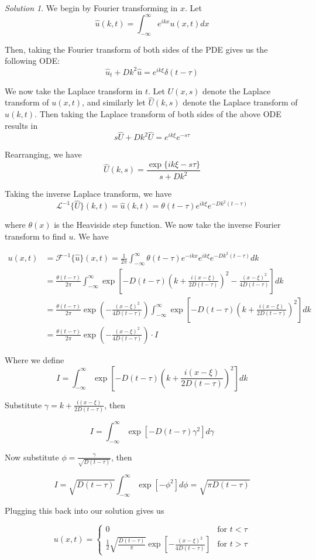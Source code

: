 \documentclass[12pt,a4paper]{article}
\theoremstyle{definition}
\theoremstyle{remark}
\newtheorem*{solution}{Solution}
\begin{document}
\begin{solution}
    We begin by Fourier transforming in $x$. Let $$\hat u(k,t) = \int_{-\infty}^\infty e^{ikx} u(x,t) dx$$

    Then, taking the Fourier transform of both sides of the PDE gives us the following ODE: $$\hat u_t + Dk^2 \hat u = e^{ik \xi} \delta(t-\tau)$$

    We now take the Laplace transform in $t$. Let $U(x, s)$ denote the Laplace transform of $u(x,t)$, and similarly let $\hat U(k,s)$ denote the Laplace transform of $\hat u(k,t)$. Then taking the Laplace transform of both sides of the above ODE results in $$s \hat U + Dk^2 \hat U = e^{ik\xi}e^{-s\tau}$$

    Rearranging, we have $$\hat U(k, s) = \frac{\exp\{ik\xi - s\tau\}}{s+Dk^2}$$

    Taking the inverse Laplace transform, we have $$\mathcal L^{-1}\{ \hat U \}(k, t) = \hat u (k,t) =  \theta(t-\tau) e^{ik\xi}e^{-Dk^2(t-\tau)}$$

    where $\theta(x)$ is the Heaviside step function. We now take the inverse Fourier transform to find $u$. We have 

    \begin{align*}
        u(x,t) &= \mathcal F^{-1}\{\hat u \}(x,t) = \frac{1}{2\pi} \int_{-\infty}^{\infty} \theta(t-\tau)e^{-ikx}e^{ik\xi}e^{-Dk^2(t-\tau)}dk \\ 
        &= \frac{\theta(t-\tau)}{2\pi} \int_{-\infty}^\infty \exp \left[ -D(t-\tau)\left(k+ \frac{i(x-\xi)}{2D(t-\tau)} \right)^2 - \frac{(x-\xi)^2}{4D(t-\tau)} \right] dk \\
        &= \frac{\theta(t-\tau)}{2\pi} \exp \left(-\frac{(x-\xi)^2}{4D(t-\tau)}\right) \int_{-\infty}^\infty \exp \left[ -D(t-\tau)\left(k+ \frac{i(x-\xi)}{2D(t-\tau)}\right)^2 \right] dk \\
        &= \frac{\theta(t-\tau)}{2\pi} \exp \left(-\frac{(x-\xi)^2}{4D(t-\tau)}\right) \cdot I
    \end{align*}

    Where we define $$I = \int_{-\infty}^\infty \exp \left[ -D(t-\tau)\left(k+ \frac{i(x-\xi)}{2D(t-\tau)}\right)^2 \right] dk$$

    Substitute $\gamma = k+ \frac{i(x-\xi)}{2D(t-\tau)}$, then 

    $$I = \int_{-\infty}^\infty \exp \left[ -D(t-\tau) \gamma^2 \right] d\gamma$$

    Now substitute $\phi = \frac{\gamma}{\sqrt{D(t-\tau)}}$, then 

    $$I = \sqrt{D(t-\tau)} \int_{-\infty}^\infty \exp\left[ - \phi^2 \right] d\phi = \sqrt{\pi D(t-\tau)}$$

    Plugging this back into our solution gives us 

    $$u(x,t) = \begin{cases}
        0 & \text{for $t < \tau$} \\
        \frac{1}{2} \sqrt{\frac{D(t-\tau)}{\pi}} \exp \left[ -\frac{(x-\xi)^2}{4D(t-\tau)}\right] & \text{for $t > \tau$}
    \end{cases}$$

\end{solution}
\end{document}
